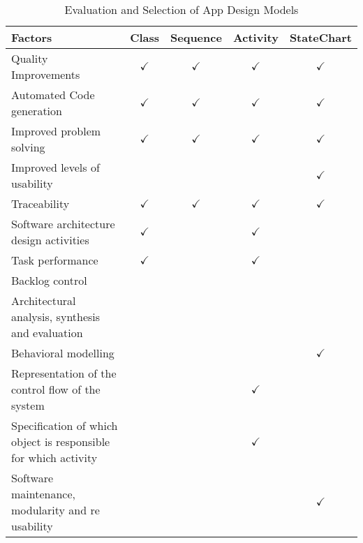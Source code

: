 \begin{table}[!h]
\footnotesize
    \begin{center}
        \begin{tabular}{ |p{4cm}|c|c|c|c|  } \hline
            
            Factors  & Class & Sequence & Activity & StateChart \\ \hline
            
            Quality Improvements & $\checkmark$   & $\checkmark$    & $\checkmark$    & $\checkmark$      \\ \hline
            Automated Code generation  & $\checkmark$    & $\checkmark$    & $\checkmark$    & $\checkmark$     \\ \hline
            Improved problem solving  & $\checkmark$    & $\checkmark$    & $\checkmark$    & $\checkmark$         \\    \hline
            Improved levels of usability  &  &  &  &  $\checkmark$     \\
            \hline
            Traceability & $\checkmark$    & $\checkmark$    & $\checkmark$    & $\checkmark$      \\ \hline
            Software architecture design activities  & $\checkmark$ &  & $\checkmark$    &     \\ \hline
            Task performance  & $\checkmark$  &  & $\checkmark$  &   \\ \hline
            Backlog control  &  &  &  &       \\    \hline
            Architectural analysis, synthesis and evaluation  &  &  &  &   \\    \hline
            Behavioral modelling &  &  &  & $\checkmark$   \\
            \hline
            Representation of the control flow of the system &  &  & $\checkmark$  &     \\
            \hline
            Specification of which object is responsible for which activity &  &  & $\checkmark$  &    \\
            \hline
            Software maintenance, modularity and re usability &  &  &  & $\checkmark$   \\
            \hline
            
            
            
            
            
            
            
        \end{tabular}
    \end{center}
    \caption{Evaluation and Selection of App Design Models}
    \label{tab:diagrams}
\end{table}